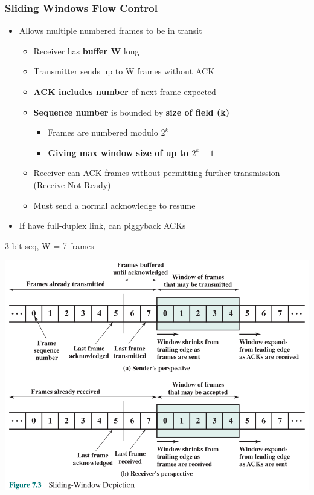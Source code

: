 \documentclass[pdflatex,compress]{beamer}
\begin{document}
\begin{frame}
	\frametitle{Sliding Windows Flow Control}
	\begin{itemize}
		\item Allows multiple numbered frames to be in transit
		\begin{itemize}
			\item Receiver has \textbf{buffer W} long
			\item Transmitter sends up to W frames without ACK
			\item \textbf{ACK includes number} of next frame expected
			\item \textbf{Sequence number} is bounded by \textbf{size of field (k)}
			\begin{itemize}
				\item Frames are numbered modulo $ 2^k $
				\item \textbf{Giving max window size of up to $ 2^k - 1 $}
			\end{itemize}
			\item Receiver can ACK frames without permitting further transmission (Receive Not Ready)
			\item Must send a normal acknowledge to resume
		\end{itemize}
		\item If have full-duplex link, can piggyback ACKs
	\end{itemize}
\end{frame}

\begin{frame}
	\begin{flushright}
		3-bit seq, W = 7 frames
	\end{flushright}
	\begin{center}
		\includegraphics[width=0.8\linewidth]{img/img03}
	\end{center}
\end{frame}
\end{document}
